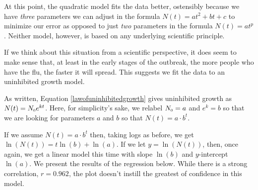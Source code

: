 \smallskip

At this point, the quadratic model fits the data better, ostensibly because we have \textit{three} parameters we can adjust in the formula $N(t) = at^2+bt+c$ to minimize our error as opposed to just \textit{two} parameters in the formula $N(t) = a t^{p}$.  Neither  model, however, is based on any underlying scientific principle.

\smallskip

If we think about this situation from a scientific perspective, it does seem to make sense that, at least in the early stages of the outbreak, the more people who have the flu, the faster it will spread.  This suggests we fit the data to an uninhibited growth model.

\smallskip

As  written,  Equation \ref{lawofuninhibitedgrowth} gives uninhibited growth as  $N(t) = N_{\mbox{\tiny$0$}}e^{kt}$. Here, for simplicity's sake, we relabel $N_{\mbox{\tiny$0$}} = a$ and $e^{k} = b$ so that we are looking for parameters $a$ and $b$ so that $N(t) = a \cdot b^{t}$.

\smallskip

\label{swineflulinearized}
If we assume $N(t) = a \cdot b^{t}$ then, taking logs as before, we get $\ln(N(t)) = t \ln(b) + \ln(a)$. If we let $y= \ln(N(t))$, then, once again, we get a linear model this time with slope $\ln(b)$ and $y$-intercept $\ln(a)$.  We present the results of the regression below.  While there is a strong correlation, $r = 0.962$, the plot doesn't instill the greatest of confidence in this model.

